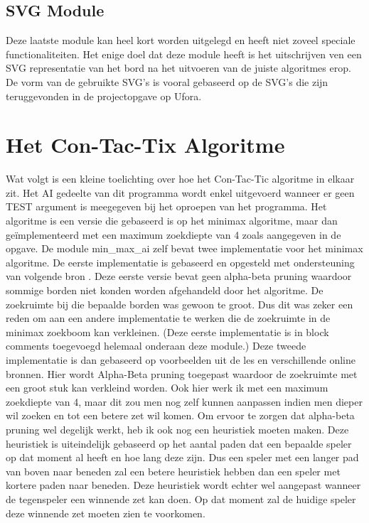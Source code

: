 \documentclass{article}
\begin{document}
\subsection{SVG Module}
Deze laatste module kan heel kort worden uitgelegd en heeft niet zoveel speciale functionaliteiten. Het enige doel dat deze module heeft is het uitschrijven ven een SVG representatie van het bord na het uitvoeren van de juiste algoritmes erop. De vorm van de gebruikte SVG's is vooral gebaseerd op de SVG's die zijn teruggevonden in de projectopgave op Ufora.

\section{Het Con-Tac-Tix Algoritme}
Wat volgt is een kleine toelichting over hoe het Con-Tac-Tic algoritme in elkaar zit. Het AI gedeelte van dit programma wordt enkel uitgevoerd wanneer er geen TEST argument is meegegeven bij het oproepen van het programma. Het algoritme is een versie die gebaseerd is op het minimax algoritme, maar dan geïmplementeerd met een maximum zoekdiepte van 4 zoals aangegeven in de opgave.\newline
De module min\_max\_ai zelf bevat twee implementatie voor het minimax algoritme. De eerste implementatie is gebaseerd en opgesteld met ondersteuning van volgende bron \cite{minimax_1}. Deze eerste versie bevat geen alpha-beta pruning waardoor sommige borden niet konden worden afgehandeld door het algoritme. De zoekruimte bij die bepaalde borden was gewoon te groot. Dus dit was zeker een reden om aan een andere implementatie te werken die de zoekruimte in de minimax zoekboom kan verkleinen. (Deze eerste implementatie is in block comments toegevoegd helemaal onderaan deze module.) \newline
Deze tweede implementatie is dan gebaseerd op voorbeelden uit de les en verschillende online bronnen. \cite{minimax-abpruning,minimax-abpruning-2}
Hier wordt Alpha-Beta pruning toegepast waardoor de zoekruimte met een groot stuk kan verkleind worden. Ook hier werk ik met een maximum zoekdiepte van 4, maar dit zou men nog zelf kunnen aanpassen indien men dieper wil zoeken en tot een betere zet wil komen. Om ervoor te zorgen dat alpha-beta pruning wel degelijk werkt, heb ik ook nog een heuristiek moeten maken. Deze heuristiek is uiteindelijk gebaseerd op het aantal paden dat een bepaalde speler op dat moment al heeft en hoe lang deze zijn. Dus een speler met een langer pad van boven naar beneden zal een betere heuristiek hebben dan een speler met kortere paden naar beneden. Deze heuristiek wordt echter wel aangepast wanneer de tegenspeler een winnende zet kan doen. Op dat moment zal de huidige speler deze winnende zet moeten zien te voorkomen.
\end{document}

